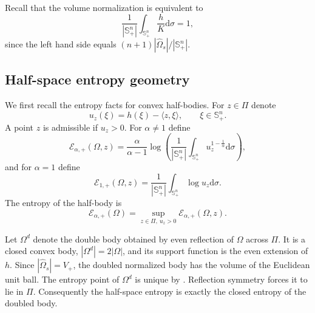 \documentclass[11pt, reqno]{amsart}
\theoremstyle{remark}
\theoremstyle{definition}
\numberwithin{equation}{section}
\newcommand{\Id}{\operatorname{Id}}
\newcommand{\PiH}{\Pi}
\newcommand{\cE}{\mathcal E}
\begin{document}

Recall that the volume normalization is equivalent to
\begin{equation}\label{eq:half-minkowski-normalized}
        \dfrac{1}{|\mathbb{S}_+^n|}\int_{\mathbb{S}_+^n}\frac{h}{K}\mathrm{d}\sigma=1,
\end{equation}
since the left hand side equals $(n+1)|\widehat\Omega_s|/|\mathbb{S}^n_+|$.

\subsection{Half-space entropy geometry}
We first recall the entropy facts for convex half-bodies. For $z\in\PiH$ denote
\begin{equation*}
        u_z(\xi)=h(\xi)-\langle z,\xi\rangle,\qquad \xi\in\mathbb{S}^n_+.
\end{equation*}
A point $z$ is admissible if $u_z>0$.  For $\alpha\ne1$ define
\begin{equation*}
        \cE_{\alpha,+}(\Omega,z)
        =\frac{\alpha}{\alpha-1}
        \log\left(\dfrac{1}{|\mathbb{S}_+^n|}\int_{\mathbb{S}_+^n} u_z^{1-\frac{1}{\alpha}}\mathrm{d}\sigma\right),
\end{equation*}
and for $\alpha=1$ define
\begin{equation*}
        \cE_{1,+}(\Omega,z)=\dfrac{1}{|\mathbb{S}_+^n|}\int_{\mathbb{S}_+^n}\log u_z \mathrm{d}\sigma.
\end{equation*}
The entropy of the half-body is
\begin{equation*}
        \cE_{\alpha,+}(\Omega)
        =\sup_{z\in\PiH,\ u_z>0}\cE_{\alpha,+}(\Omega,z).
\end{equation*}

Let $\Omega^d$ denote the double body obtained by even reflection of $\Omega$ across $\PiH$.  It is a
closed convex body, $|\Omega^d|=2|\Omega|$, and its support function is the even
extension of $h$.  Since $|\widehat\Omega_s|=V_+$, the doubled normalized body
has the volume of the Euclidean unit ball.  The entropy point of $\Omega^d$ is
unique by \cite[Lemma 2.5]{AGN2016}. Reflection symmetry forces it to lie in
$\PiH$.  Consequently the half-space entropy is exactly the closed entropy of
the doubled body.
\end{document}
